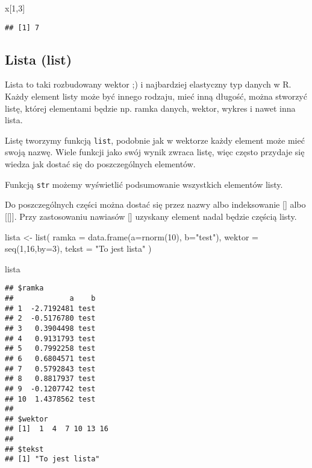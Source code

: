 \documentclass[
]{book}
\newenvironment{Shaded}{\begin{snugshade}}{\end{snugshade}}
\newcommand{\AttributeTok}[1]{\textcolor[rgb]{0.77,0.63,0.00}{#1}}
\newcommand{\DecValTok}[1]{\textcolor[rgb]{0.00,0.00,0.81}{#1}}
\newcommand{\FunctionTok}[1]{\textcolor[rgb]{0.00,0.00,0.00}{#1}}
\newcommand{\NormalTok}[1]{#1}
\newcommand{\OtherTok}[1]{\textcolor[rgb]{0.56,0.35,0.01}{#1}}
\newcommand{\StringTok}[1]{\textcolor[rgb]{0.31,0.60,0.02}{#1}}
\begin{document}
\begin{Shaded}
\begin{Highlighting}[]
\NormalTok{x[}\DecValTok{1}\NormalTok{,}\DecValTok{3}\NormalTok{]}
\end{Highlighting}
\end{Shaded}

\begin{verbatim}
## [1] 7
\end{verbatim}

\hypertarget{lista-list}{%
\subsection{Lista (list)}\label{lista-list}}

Lista to taki rozbudowany wektor ;) i najbardziej elastyczny typ danych w R. Każdy element listy może być innego rodzaju, mieć inną długość, można stworzyć listę, której elementami będzie np. ramka danych, wektor, wykres i nawet inna lista.

Listę tworzymy funkcją \texttt{list}, podobnie jak w wektorze każdy element może mieć swoją nazwę. Wiele funkcji jako swój wynik zwraca listę, więc często przydaje się wiedza jak dostać się do poszczególnych elementów.

Funkcją \texttt{str} możemy wyświetlić podsumowanie wszystkich elementów listy.

Do poszczególnych części można dostać się przez nazwy albo indeksowanie {[}{]} albo {[}{[}{]}{]}. Przy zastosowaniu nawiasów {[}{]} uzyskany element nadal będzie częścią listy.

\begin{Shaded}
\begin{Highlighting}[]
\NormalTok{lista }\OtherTok{\textless{}{-}} \FunctionTok{list}\NormalTok{( }\AttributeTok{ramka =} \FunctionTok{data.frame}\NormalTok{(}\AttributeTok{a=}\FunctionTok{rnorm}\NormalTok{(}\DecValTok{10}\NormalTok{), }\AttributeTok{b=}\StringTok{"test"}\NormalTok{), }
               \AttributeTok{wektor =} \FunctionTok{seq}\NormalTok{(}\DecValTok{1}\NormalTok{,}\DecValTok{16}\NormalTok{,}\AttributeTok{by=}\DecValTok{3}\NormalTok{), }
               \AttributeTok{tekst =} \StringTok{"To jest lista"}\NormalTok{ )}

\NormalTok{lista}
\end{Highlighting}
\end{Shaded}

\begin{verbatim}
## $ramka
##             a    b
## 1  -2.7192481 test
## 2  -0.5176780 test
## 3   0.3904498 test
## 4   0.9131793 test
## 5   0.7992258 test
## 6   0.6804571 test
## 7   0.5792843 test
## 8   0.8817937 test
## 9  -0.1207742 test
## 10  1.4378562 test
## 
## $wektor
## [1]  1  4  7 10 13 16
## 
## $tekst
## [1] "To jest lista"
\end{verbatim}
\end{document}
